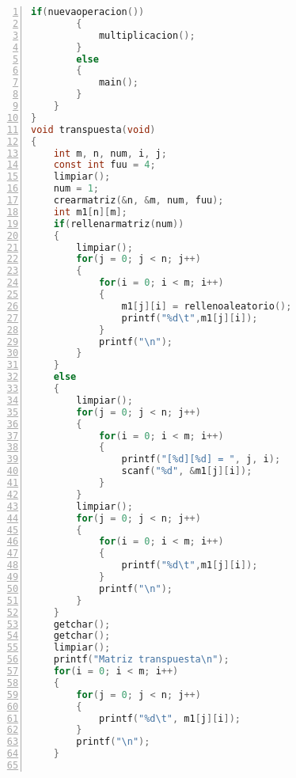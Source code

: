 \documentclass[letterpaper]{article}
\begin{document}
\begin{lstlisting}[language=C, numbers=left, showstringspaces=false, tabsize=3]
		if(nuevaoperacion())
		{
			multiplicacion();
		}
		else
		{
			main();
		}
	}
}
void transpuesta(void)
{
	int m, n, num, i, j;
	const int fuu = 4;
	limpiar();
	num = 1;
	crearmatriz(&n, &m, num, fuu);
	int m1[n][m];
	if(rellenarmatriz(num))
	{
		limpiar();
		for(j = 0; j < n; j++)
		{
			for(i = 0; i < m; i++)
			{
				m1[j][i] = rellenoaleatorio();
				printf("%d\t",m1[j][i]);
			}
			printf("\n");
		}
	}
	else
	{
		limpiar();
		for(j = 0; j < n; j++)
		{
			for(i = 0; i < m; i++)
			{
				printf("[%d][%d] = ", j, i);
				scanf("%d", &m1[j][i]);
			}
		}
		limpiar();
		for(j = 0; j < n; j++)
		{
			for(i = 0; i < m; i++)
			{
				printf("%d\t",m1[j][i]);
			}
			printf("\n");
		}
	}
	getchar();
	getchar();
	limpiar();
	printf("Matriz transpuesta\n");
	for(i = 0; i < m; i++)
	{
		for(j = 0; j < n; j++)
		{
			printf("%d\t", m1[j][i]);
		}
		printf("\n");
	}


\end{lstlisting}
\end{document}
